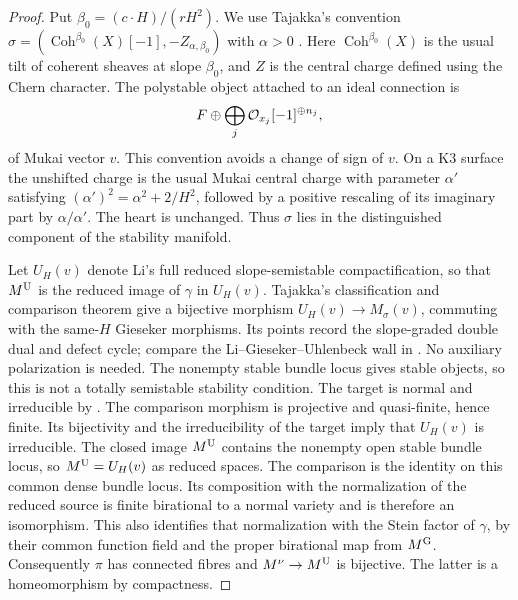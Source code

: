 \begin{proof}
Put $\beta_0=(c\cdot H)/(rH^2)$. We use Tajakka's convention
$\sigma=(\operatorname{Coh}^{\beta_0}(X)[-1],-Z_{\alpha,\beta_0})$
with $\alpha>0$ \cite[Section~2.3]{Taj23}.
Here $\operatorname{Coh}^{\beta_0}(X)$ is the usual tilt of coherent
sheaves at slope $\beta_0$, and $Z$ is the central charge defined using
the Chern character. The polystable object attached to an ideal connection is
\begin{equation}\label{eq:wall-object}
 F\oplus\bigoplus_j\mathcal O_{x_j}[-1]^{\oplus n_j},
\end{equation}
of Mukai vector $v$. This convention avoids a change of sign of $v$.
On a K3 surface the unshifted charge is the usual Mukai central charge
with parameter $\alpha'$ satisfying
$(\alpha')^2=\alpha^2+2/H^2$, followed by a positive rescaling of its
imaginary part by $\alpha/\alpha'$. The heart is unchanged. Thus $\sigma$
lies in the distinguished component of the stability manifold.

Let $U_H(v)$ denote Li's full reduced slope-semistable compactification,
so that $M^{\mathrm U}$ is the reduced image of $\gamma$ in $U_H(v)$.
Tajakka's classification and comparison theorem
\cite[Proposition~2.2 and Theorem~7.1]{Taj23} give a bijective morphism
$U_H(v)\to M_\sigma(v)$, commuting with the same-$H$ Gieseker morphisms.
Its points record the slope-graded double dual and defect cycle;
compare the Li--Gieseker--Uhlenbeck wall in
\cite[Proposition~8.2]{BM14}. No auxiliary polarization is needed.
The nonempty stable bundle locus gives stable objects, so this is not a
totally semistable stability condition.
The target is normal and irreducible by
\cite[Theorems~5.1 and 5.5]{AS23}.
The comparison morphism is projective and quasi-finite, hence finite.
Its bijectivity and the irreducibility of the target imply that $U_H(v)$
is irreducible. The closed image $M^{\mathrm U}$ contains the nonempty open stable
bundle locus, so $M^{\mathrm U}=U_H(v)$ as reduced spaces. The comparison is the
identity on this common dense bundle locus. Its composition
with the normalization of the reduced source is finite birational to a
normal variety and is therefore an isomorphism. This also identifies
that normalization with the Stein factor of $\gamma$, by their common
function field and the proper birational map from $M^{\mathrm G}$.
Consequently $\pi$ has connected fibres and $M^{\nu}\to M^{\mathrm U}$ is bijective.
The latter is a homeomorphism by compactness.


\end{proof}
